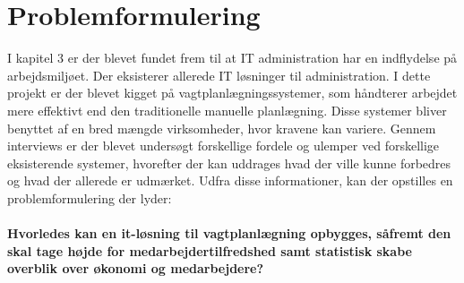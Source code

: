 


\section{Problemformulering}

I kapitel 3 er der blevet fundet frem til at IT administration har en indflydelse på arbejdsmiljøet. Der eksisterer allerede IT løsninger til administration. I dette projekt er der blevet kigget på vagtplanlægningssystemer, som håndterer arbejdet mere effektivt end den traditionelle manuelle planlægning. Disse systemer bliver benyttet af en bred mængde virksomheder, hvor kravene kan variere. Gennem interviews er der blevet undersøgt forskellige fordele og ulemper ved forskellige eksisterende systemer, hvorefter der kan uddrages hvad der ville kunne forbedres og hvad der allerede er udmærket. Udfra disse informationer, kan der opstilles en problemformulering der lyder:
\\\\
\textbf{Hvorledes kan en it-løsning til vagtplanlægning opbygges, såfremt den skal tage højde for medarbejdertilfredshed samt statistisk skabe overblik over økonomi og medarbejdere?}